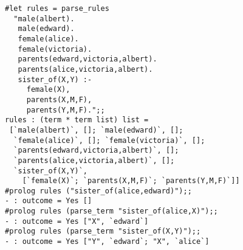 \begin{slide*}


\vspace*{0.1cm}

\begin{black}\begin{footnotesize}\begin{verbatim}
#let rules = parse_rules
  "male(albert).
   male(edward).
   female(alice).
   female(victoria).
   parents(edward,victoria,albert).
   parents(alice,victoria,albert).
   sister_of(X,Y) :-
     female(X),
     parents(X,M,F),
     parents(Y,M,F).";;
rules : (term * term list) list =
 [`male(albert)`, []; `male(edward)`, [];
  `female(alice)`, []; `female(victoria)`, [];
  `parents(edward,victoria,albert)`, [];
  `parents(alice,victoria,albert)`, [];
  `sister_of(X,Y)`,
    [`female(X)`; `parents(X,M,F)`; `parents(Y,M,F)`]]
#prolog rules ("sister_of(alice,edward)");;
- : outcome = Yes []
#prolog rules (parse_term "sister_of(alice,X)");;
- : outcome = Yes ["X", `edward`]
#prolog rules (parse_term "sister_of(X,Y)");;
- : outcome = Yes ["Y", `edward`; "X", `alice`]
\end{verbatim}\end{footnotesize}\end{black}

\end{slide*}



